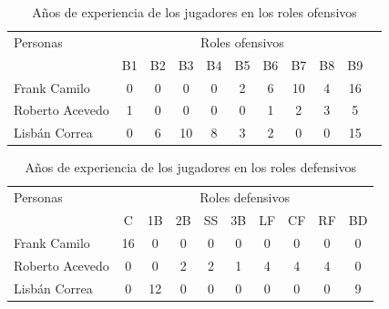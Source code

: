 

\begin{table}[H]
		\centering
	\caption{Años de experiencia de los jugadores en los roles ofensivos}\label{exp-of}
		\begin{tabular}{l | c c c c c c c c c c}
			\toprule[1.7pt]
			\multicolumn{1}{l}{Personas}   &    \multicolumn{9}{c}{Roles ofensivos}    &  \\ \cline{1-10}
			                                                              & B1 & B2 & B3 & B4 & B5 & B6 & B7 & B8 & B9 &  \\ \cline{2-10}
			Frank Camilo                                                 & 0  & 0  & 0  & 0  & 2  & 6  & 10 & 4  & 16 &  \\
			Roberto Acevedo                                              & 1  & 0  & 0  & 0  & 0  & 1  & 2  & 3  & 5  &  \\
			Lisbán Correa                                                & 0  & 6  & 10 & 8  & 3  & 2  & 0  & 0  & 15 &  \\
			\bottomrule[1pt]                              
		\end{tabular}
	
\end{table}


\begin{table}[H]
	\centering
	\caption{Años de experiencia de los jugadores en los roles defensivos}\label{exp-def}

	\begin{tabular}{l | c c c c c c c c c }
		\toprule[1.7pt]
		\multicolumn{1}{l}{Personas} &    \multicolumn{9}{c}{Roles defensivos}  \\ \cline{1-10}
		                                                           & C  & 1B & 2B & SS & 3B & LF & CF & RF & BD \\ \cline{2-10}
		Frank Camilo                                               & 16 & 0  & 0  & 0  & 0  & 0  & 0  & 0  & 0                           \\
		Roberto Acevedo                                            & 0  & 0  & 2  & 2  & 1  & 4  & 4  & 4  & 0                            \\
		Lisbán Correa                                              & 0  & 12 & 0  & 0  & 0  & 0  & 0  & 0  & 9\\
		\bottomrule[1pt]                             
	\end{tabular}

\end{table}


